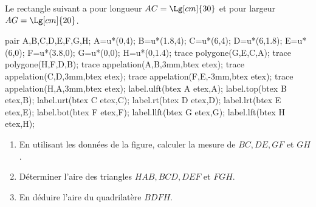 \begin{exercice*}
   Le rectangle suivant a pour longueur $AC =\Lg[cm]{30}$ et pour largeur $AG =\Lg[cm]{20}$.
   \begin{center}
      \begin{Geometrie}[CoinBG={(-0.5u,-0.5u)},CoinHD={(6.5u,4.5u)}]
         pair A,B,C,D,E,F,G,H;
         A=u*(0,4);
         B=u*(1.8,4);
         C=u*(6,4);
         D=u*(6,1.8);
         E=u*(6,0);
         F=u*(3.8,0);
         G=u*(0,0);
         H=u*(0,1.4);
         trace polygone(G,E,C,A);
         trace polygone(H,F,D,B);
         trace appelation(A,B,3mm,btex  etex);
         trace appelation(C,D,3mm,btex  etex);
         trace appelation(F,E,-3mm,btex  etex);
         trace appelation(H,A,3mm,btex  etex);
         label.ulft(btex A etex,A);
         label.top(btex B etex,B);
         label.urt(btex C etex,C);
         label.rt(btex D etex,D);
         label.lrt(btex E etex,E);
         label.bot(btex F etex,F);
         label.llft(btex G etex,G);
         label.lft(btex H etex,H);
      \end{Geometrie}
   \end{center}
   \begin{enumerate}
      \item En utilisant les données de la figure, calculer la mesure de $BC, DE, GF$ et $GH$.
      \item Déterminer l'aire des triangles $HAB, BCD, DEF$ et $FGH$.
      \item En déduire l'aire du quadrilatère $BDFH$.
   \end{enumerate}
\end{exercice*}